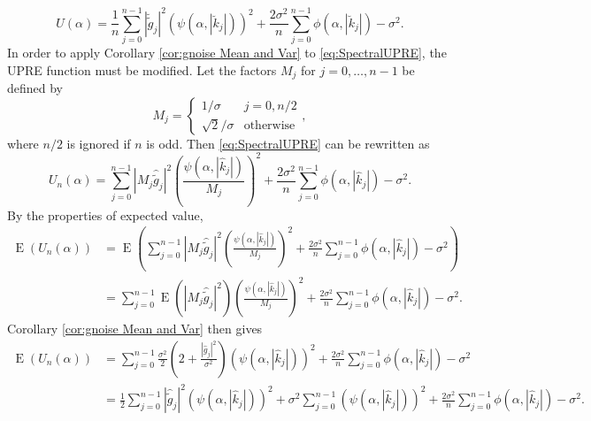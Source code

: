 \documentclass[12pt,notitlepage]{report}
\newcommand{\gnoise}{\widetilde{g}}	%
\newcommand{\dct}[1]{\breve{#1}}	%
\newcommand{\regparam}{\alpha}
\newcommand{\filt}{\phi}
\newcommand{\mfilt}{\psi}
\newcommand{\noiseSD}{\sigma}	%
\DeclareMathOperator{\E}{E}	%
\newcommand{\U}{U}	%
\begin{document}
\begin{equation}
\U(\regparam) = \frac{1}{n}\sum_{j = 0}^{n-1} |\dct{\gnoise}_j|^2(\mfilt(\regparam,|\dct{k}_j|))^2 + \frac{2\noiseSD^2}{n}\sum_{j = 0}^{n-1} \filt(\regparam,|\dct{k}_j|) - \noiseSD^2.
\label{eq:UPRE DCT}
\end{equation}
In order to apply Corollary \ref{cor:gnoise Mean and Var} to \eqref{eq:SpectralUPRE}, the UPRE function must be modified. Let the factors $M_j$ for $j = 0,\ldots,n-1$ be defined by
\[M_j = \begin{cases}
1/\noiseSD & j = 0, n/2 \\
\sqrt{2}/\noiseSD & \text{otherwise}
\end{cases},\]
where $n/2$ is ignored if $n$ is odd. Then \eqref{eq:SpectralUPRE} can be rewritten as
\begin{equation}
\label{eq:SpectralUPREnModified}
\U_n(\regparam) = \sum_{j = 0}^{n-1} |M_j\widehat{\gnoise}_j|^2\left(\frac{\mfilt(\regparam,|\widehat{k}_j|)}{M_j}\right)^2 + \frac{2\noiseSD^2}{n}\sum_{j = 0}^{n-1} \filt(\regparam,|\widehat{k}_j|) - \noiseSD^2.
\end{equation}
By the properties of expected value,
\begin{align*}
\E(\U_n(\regparam)) &= \E\left(\sum_{j = 0}^{n-1} |M_j\widehat{\gnoise}_j|^2\left(\frac{\mfilt(\regparam,|\widehat{k}_j|)}{M_j}\right)^2 + \frac{2\noiseSD^2}{n}\sum_{j = 0}^{n-1} \filt(\regparam,|\widehat{k}_j|) - \noiseSD^2\right) \\
&= \sum_{j = 0}^{n-1} \E\left(|M_j\widehat{\gnoise}_j|^2\right)\left(\frac{\mfilt(\regparam,|\widehat{k}_j|)}{M_j}\right)^2 + \frac{2\noiseSD^2}{n}\sum_{j = 0}^{n-1} \filt(\regparam,|\widehat{k}_j|) - \noiseSD^2.
\end{align*}
Corollary \ref{cor:gnoise Mean and Var} then gives
\begin{equation}
\begin{split}
\E(\U_n(\regparam)) &= \sum_{j = 0}^{n-1} \frac{\noiseSD^2}{2}\left(2 + \frac{|\widehat{g}_j|^2}{\noiseSD^2}\right)(\mfilt(\regparam,|\widehat{k}_j|))^2 + \frac{2\noiseSD^2}{n}\sum_{j = 0}^{n-1} \filt(\regparam,|\widehat{k}_j|) - \noiseSD^2 \\
&= \frac{1}{2}\sum_{j = 0}^{n-1} |\widehat{\gnoise}_j|^2(\mfilt(\regparam,|\widehat{k}_j|))^2 + \noiseSD^2\sum_{j = 0}^{n-1} (\mfilt(\regparam,|\widehat{k}_j|))^2 + \frac{2\noiseSD^2}{n}\sum_{j = 0}^{n-1} \filt(\regparam,|\widehat{k}_j|) - \noiseSD^2.
\end{split}
\label{eq:UPRE Expected Value}
\end{equation}
\end{document}
